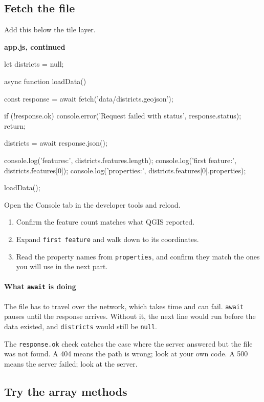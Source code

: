 \documentclass{article}
\newcommand{\cd}[1]{\texttt{#1}}
\newcommand{\codecap}[1]{%
  \par\vspace{.9em}\noindent\textbf{#1}\par\vspace{-.6em}}
\begin{document}
\subsection{Fetch the file}

Add this below the tile layer.

\codecap{app.js, continued}
\begin{code}
let districts = null;

async function loadData() {
  const response = await fetch('data/districts.geojson');

  if (!response.ok) {
    console.error('Request failed with status', response.status);
    return;
  }

  districts = await response.json();

  console.log('features:', districts.features.length);
  console.log('first feature:', districts.features[0]);
  console.log('properties:', districts.features[0].properties);
}

loadData();
\end{code}

Open the Console tab in the developer tools and reload.

\begin{enumerate}
  \item Confirm the feature count matches what QGIS reported.
  \item Expand \cd{first feature} and walk down to its coordinates.
  \item Read the property names from \cd{properties}, and confirm they
        match the ones you will use in the next part.
\end{enumerate}

\paragraph{What \texttt{await} is doing}
The file has to travel over the network, which takes time and can fail.
\cd{await} pauses until the response arrives. Without it, the next line
would run before the data existed, and \cd{districts} would still be
\cd{null}.

The \cd{response.ok} check catches the case where the server answered but
the file was not found. A 404 means the path is wrong; look at your own
code. A 500 means the server failed; look at the server.


\subsection{Try the array methods}
\end{document}
